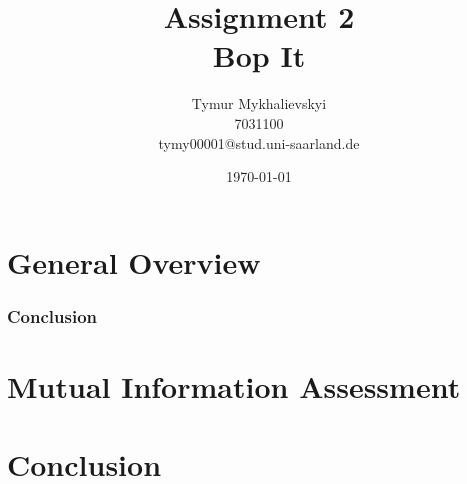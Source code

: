 \documentclass{article}
\title{\vspace{-2cm}Assignment 2\\
    Bop It}
\author{Tymur Mykhalievskyi\\ 7031100\\ tymy00001@stud.uni-saarland.de}
\date{\today}
\begin{document}
\maketitle

\section{General Overview}


\subsubsection*{Conclusion}
 

\section{Mutual Information Assessment}


\section{Conclusion}

	

\end{document}
